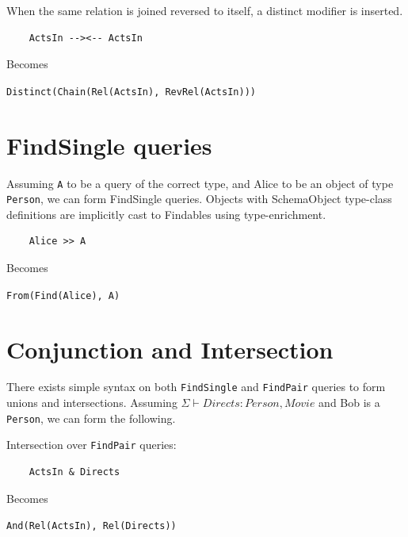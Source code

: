 \documentclass[12pt,a4paper,twoside,openright]{report}
\newcommand\codeName[1]{\texttt{#1}}
\newcommand{\typeRule}[2]{\Sigma\vdash #1 \colon #2}
\renewcommand{\baselinestretch}{1.1}    %
\begin{document}
\begin{framed}

When the same relation is joined reversed to itself, a distinct modifier is inserted.

\renewcommand{\baselinestretch}{0.8}
\begin{framed}
\begin{verbatim}
 	ActsIn --><-- ActsIn
\end{verbatim}
\end{framed}
Becomes
\begin{framed}
\codeName{Distinct(Chain(Rel(ActsIn), RevRel(ActsIn)))}
\end{framed}
\end{framed}
\renewcommand{\baselinestretch}{1.1}

\section{FindSingle queries}
Assuming \codeName{A} to be a query of the correct type, and Alice to be an object of type \codeName{Person}, we can form FindSingle queries. Objects with SchemaObject type-class definitions are implicitly cast to Findables using type-enrichment.
\renewcommand{\baselinestretch}{0.8}
\begin{framed}
\begin{framed}
\begin{verbatim}
 	Alice >> A
\end{verbatim}
\end{framed}
Becomes
\begin{framed}
\codeName{From(Find(Alice), A)}
\end{framed}
\end{framed}
\renewcommand{\baselinestretch}{1.1}

\section{Conjunction and Intersection}
There exists simple syntax on both \codeName{FindSingle} and \codeName{FindPair} queries to form unions and intersections.
Assuming $\typeRule{Directs}{Person, Movie}$ and Bob is a \codeName{Person}, we can form the following.

\renewcommand{\baselinestretch}{0.8}
\begin{framed}
Intersection over \codeName{FindPair} queries:
\begin{framed}
\begin{verbatim}
 	ActsIn & Directs
\end{verbatim}
\end{framed}
Becomes
\begin{framed}
\codeName{And(Rel(ActsIn), Rel(Directs))}
\end{framed}
\end{framed}
\end{document}
